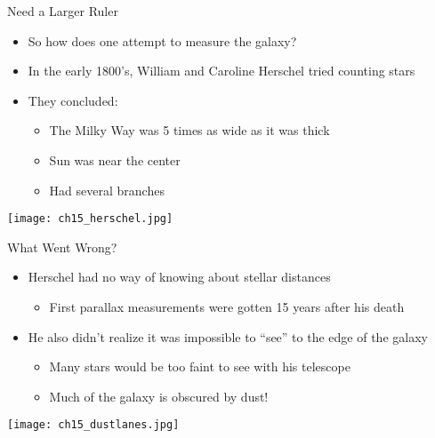 \documentclass[pdf,aspectratio=169]{beamer}
\begin{document}
\begin{frame}{Need a Larger Ruler}
  \begin{itemize}
	\item So how does one attempt to measure the galaxy?
	\item In the early 1800's, William and Caroline Herschel tried counting stars
	 \item They concluded:
	   \begin{itemize}
		 \item The Milky Way was 5 times as wide as it was thick
		 \item Sun was near the center
		 \item Had several branches
	   \end{itemize}
  \end{itemize}
  \begin{center}
	\texttt{[image: ch15\_herschel.jpg]}
  \end{center}
\end{frame}

\begin{frame}{What Went Wrong?}
  \begin{itemize}
	\item Herschel had no way of knowing about stellar distances
	  \begin{itemize}
		\item First parallax measurements were gotten 15 years after his death
	  \end{itemize}
	\item He also didn't realize it was impossible to ``see'' to the edge of the galaxy
	  \begin{itemize}
		\item Many stars would be too faint to see with his telescope
		\item Much of the galaxy is obscured by dust!
	  \end{itemize}
  \end{itemize}
  \begin{center}
	\texttt{[image: ch15\_dustlanes.jpg]}
  \end{center}
\end{frame}
\end{document}
